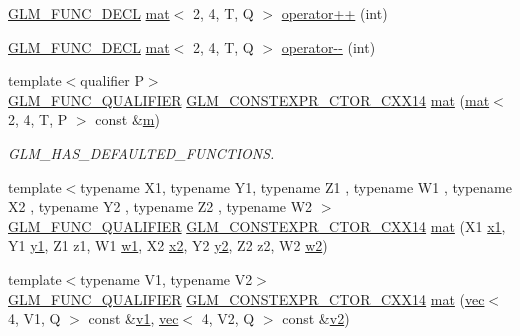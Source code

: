 \begin{DoxyCompactItemize}
\hyperlink{setup_8hpp_ab2d052de21a70539923e9bcbf6e83a51}{G\+L\+M\+\_\+\+F\+U\+N\+C\+\_\+\+D\+E\+CL} \hyperlink{structglm_1_1mat}{mat}$<$ 2, 4, T, Q $>$ \hyperlink{structglm_1_1mat_3_012_00_014_00_01_t_00_01_q_01_4_a1f4e7b363fde7f785ace4e12a9c41316}{operator++} (int)
\item 
\hyperlink{setup_8hpp_ab2d052de21a70539923e9bcbf6e83a51}{G\+L\+M\+\_\+\+F\+U\+N\+C\+\_\+\+D\+E\+CL} \hyperlink{structglm_1_1mat}{mat}$<$ 2, 4, T, Q $>$ \hyperlink{structglm_1_1mat_3_012_00_014_00_01_t_00_01_q_01_4_a740949114d5da039edaed9052968f54b}{operator-\/-\/} (int)
\item 
{\footnotesize template$<$qualifier P$>$ }\\\hyperlink{setup_8hpp_a33fdea6f91c5f834105f7415e2a64407}{G\+L\+M\+\_\+\+F\+U\+N\+C\+\_\+\+Q\+U\+A\+L\+I\+F\+I\+ER} \hyperlink{setup_8hpp_a0900f9145e68bf6061b6f5e7be3fa751}{G\+L\+M\+\_\+\+C\+O\+N\+S\+T\+E\+X\+P\+R\+\_\+\+C\+T\+O\+R\+\_\+\+C\+X\+X14} \hyperlink{structglm_1_1mat_3_012_00_014_00_01_t_00_01_q_01_4_a20ea2b3c9367a0ab927a96a1b37cf119}{mat} (\hyperlink{structglm_1_1mat}{mat}$<$ 2, 4, T, P $>$ const \&\hyperlink{_s_d_l__opengl__glext_8h_af593500c283bf1a787a6f947f503a5c2}{m})
\begin{DoxyCompactList}\small\item\em G\+L\+M\+\_\+\+H\+A\+S\+\_\+\+D\+E\+F\+A\+U\+L\+T\+E\+D\+\_\+\+F\+U\+N\+C\+T\+I\+O\+NS. \end{DoxyCompactList}\item 
{\footnotesize template$<$typename X1, typename Y1, typename Z1 , typename W1 , typename X2 , typename Y2 , typename Z2 , typename W2 $>$ }\\\hyperlink{setup_8hpp_a33fdea6f91c5f834105f7415e2a64407}{G\+L\+M\+\_\+\+F\+U\+N\+C\+\_\+\+Q\+U\+A\+L\+I\+F\+I\+ER} \hyperlink{setup_8hpp_a0900f9145e68bf6061b6f5e7be3fa751}{G\+L\+M\+\_\+\+C\+O\+N\+S\+T\+E\+X\+P\+R\+\_\+\+C\+T\+O\+R\+\_\+\+C\+X\+X14} \hyperlink{structglm_1_1mat_3_012_00_014_00_01_t_00_01_q_01_4_a6d81f6d524f14f933d44911cc8049b01}{mat} (X1 \hyperlink{_s_d_l__opengl__glext_8h_a49825216c96caaeb09237b36651181c5}{x1}, Y1 \hyperlink{_s_d_l__opengl__glext_8h_a3af6c78fcdfccea028a5878bc747ef39}{y1}, Z1 z1, W1 \hyperlink{_s_d_l__opengl__glext_8h_ab5b747bf5adb1f9134337c30b9a4ce84}{w1}, X2 \hyperlink{_s_d_l__opengl__glext_8h_a7b907a03236685c534d89d604cff23c8}{x2}, Y2 \hyperlink{_s_d_l__opengl__glext_8h_a2be1135ed68e8d80fa9e130c7814f8c2}{y2}, Z2 z2, W2 \hyperlink{_s_d_l__opengl__glext_8h_a1ca5aca787be24213d9591fdf074b094}{w2})
\item 
{\footnotesize template$<$typename V1, typename V2$>$ }\\\hyperlink{setup_8hpp_a33fdea6f91c5f834105f7415e2a64407}{G\+L\+M\+\_\+\+F\+U\+N\+C\+\_\+\+Q\+U\+A\+L\+I\+F\+I\+ER} \hyperlink{setup_8hpp_a0900f9145e68bf6061b6f5e7be3fa751}{G\+L\+M\+\_\+\+C\+O\+N\+S\+T\+E\+X\+P\+R\+\_\+\+C\+T\+O\+R\+\_\+\+C\+X\+X14} \hyperlink{structglm_1_1mat_3_012_00_014_00_01_t_00_01_q_01_4_a727b28490a4fbcaa1cf57cc335d1205d}{mat} (\hyperlink{structglm_1_1vec}{vec}$<$ 4, V1, Q $>$ const \&\hyperlink{_s_d_l__opengl__glext_8h_a435c176a02c061b43e19bdf7c86cceae}{v1}, \hyperlink{structglm_1_1vec}{vec}$<$ 4, V2, Q $>$ const \&\hyperlink{_s_d_l__opengl__glext_8h_a0928f6d0f0f794ba000a21dfae422136}{v2})

\end{DoxyCompactItemize}
